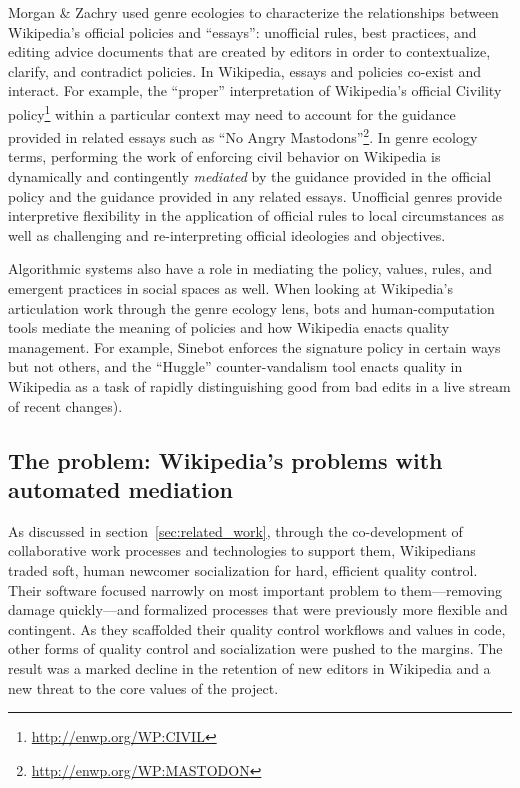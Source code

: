 Morgan \& Zachry used genre ecologies to characterize the relationships between Wikipedia's official policies and ``essays'': unofficial rules, best practices, and editing advice documents that are created by editors in order to contextualize, clarify, and contradict policies\cite{morgan2010negotiating}. In Wikipedia, essays and policies co-exist and interact. For example, the ``proper'' interpretation of Wikipedia's official Civility policy\footnote{\url{http://enwp.org/WP:CIVIL}} within a particular context may need to account for the guidance provided in related essays such as ``No Angry Mastodons''\footnote{\url{http://enwp.org/WP:MASTODON}}. In genre ecology terms, performing the work of enforcing civil behavior on Wikipedia is dynamically and contingently \emph{mediated} by the guidance provided in the official policy and the guidance provided in any related essays. Unofficial genres provide interpretive flexibility in the application of official rules to local circumstances as well as challenging and re-interpreting official ideologies and objectives.

Algorithmic systems also have a role in mediating the policy, values, rules, and emergent practices in social spaces as well\cite{lessig1999code,suchman2007human,orlikowski2015algorithm}.  When looking at Wikipedia's articulation work through the genre ecology lens, bots and human-computation tools mediate the meaning of policies and how Wikipedia enacts quality management. For example, Sinebot enforces the signature policy in certain ways but not others\cite{geiger2011lives}, and the ``Huggle'' counter-vandalism tool enacts quality in Wikipedia as a task of rapidly distinguishing good from bad edits in a live stream of recent changes\cite{halfaker2014snuggle}).

\subsection{The problem: Wikipedia's problems with automated mediation}
As discussed in section~\ref{sec:related_work}, through the co-development of collaborative work processes and technologies to support them, Wikipedians traded soft, human newcomer socialization for hard, efficient quality control. Their software focused narrowly on most important problem to them---removing damage quickly---and formalized processes that were previously more flexible and contingent. As they scaffolded their quality control workflows and values in code, other forms of quality control and socialization were pushed to the margins.  The result was a marked decline in the retention of new editors in Wikipedia and a new threat to the core values of the project.

